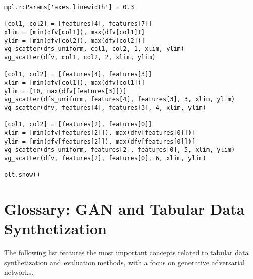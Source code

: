 \documentclass[oneside,10pt]{book}
\begin{document}
\begin{lstlisting}
mpl.rcParams['axes.linewidth'] = 0.3

[col1, col2] = [features[4], features[7]]
xlim = [min(dfv[col1]), max(dfv[col1])]
ylim = [min(dfv[col2]), max(dfv[col2])]
vg_scatter(dfs_uniform, col1, col2, 1, xlim, ylim)
vg_scatter(dfv, col1, col2, 2, xlim, ylim)

[col1, col2] = [features[4], features[3]]
xlim = [min(dfv[col1]), max(dfv[col1])]
ylim = [10, max(dfv[features[3]])]
vg_scatter(dfs_uniform, features[4], features[3], 3, xlim, ylim)
vg_scatter(dfv, features[4], features[3], 4, xlim, ylim)

[col1, col2] = [features[2], features[0]]
xlim = [min(dfv[features[2]]), max(dfv[features[0]])]
ylim = [min(dfv[features[2]]), max(dfv[features[0]])]
vg_scatter(dfs_uniform, features[2], features[0], 5, xlim, ylim)
vg_scatter(dfv, features[2], features[0], 6, xlim, ylim)

plt.show()
\end{lstlisting}





\chapter{Glossary: GAN and Tabular Data Synthetization}\label{aasdaaqw}

The following list features the most important concepts related to tabular data synthetization and evaluation methods, with a focus on generative adversarial networks. %




\end{document}
